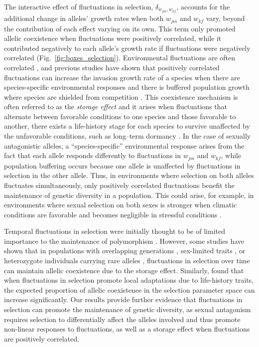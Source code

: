 The interactive effect of fluctuations in selection, $\delta_{w_{jm},w_{kf}}$, accounts for the additional change in alleles' growth rates when both $w_{jm}$ and $w_{kf}$ vary, beyond the contribution of each effect varying on its own.  This term only promoted allelic coexistence when fluctuations were positively correlated,  while it contributed negatively to each allele's growth rate if fluctuations were negatively correlated (Fig.~\ref{fig:boxes_selection}). Environmental fluctuations are often correlated \citep{steele1985comparison}, and previous studies have shown that positively correlated fluctuations can increase the invasion growth rate of a species when there are species-specific environmental responses and there is buffered population growth where species are shielded from competition \citep{schreiber2021positively}. This coexistence mechanism
is often referred to as the \textit{storage effect} and it arises when fluctuations that alternate between favorable conditions to one species and those favorable to another, there exists a life-history stage for each species to survive unaffected by the unfavorable conditions, such as long--term dormancy \citep{Chesson2000,ellner2016quantify,barabas_chessons_2018,schreiber2021positively}. In the case of sexually antagonistic alleles,  a ``species-specific'' environmental response arises from the fact that each allele responds differently to fluctuations in $w_{jm}$ and $w_{kf}$, while population buffering occurs because one allele is unaffected by fluctuations in selection in the other allele. Thus, in environments where selection on both alleles fluctuates simultaneously, only positively correlated fluctuations benefit the maintenance of genetic diversity in a population. This could arise, for example, in environments where sexual selection on both sexes is stronger when climatic conditions are favorable and becomes negligible in stressful conditions \citep{cockburn2008swingin}.


Temporal fluctuations in selection were initially thought to be of limited importance to the maintenance of polymorphism  \citep{hedrick1974genetic,hedrick1986genetic}. However, some studies have shown that in populations with overlapping generations \citep{ellner1996patterns,sasaki1995evolutionarily}, sex-limited traits \citep{reinhold2000maintenance}, or heterozygote individuals carrying rare alleles \citep{schreiber2020factors}, fluctuations in selection over time can maintain allelic coexistence due to the storage effect. Similarly, \citet{connallon2018environmental} found that when fluctuations in selection promote local adaptations due to life-history traits, the expected proportion of allelic coexistence in the selection parameter space can increase significantly. Our results provide further evidence that fluctuations in selection can promote the maintenance of genetic diversity, as sexual antagonism requires selection to differentially affect the alleles involved and thus promote non-linear responses to fluctuations, as well as a storage effect when fluctuations are positively correlated.

